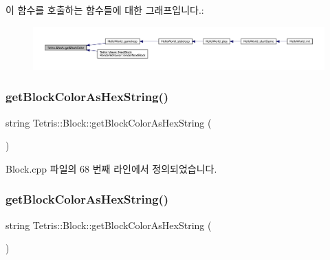 이 함수를 호출하는 함수들에 대한 그래프입니다.\+:
\nopagebreak
\begin{figure}[H]
\begin{center}
\leavevmode
\includegraphics[width=350pt]{class_tetris_1_1_block_ad61aea379870fbb3668d49e4c3c748ed_icgraph}
\end{center}
\end{figure}
\mbox{\label{class_tetris_1_1_block_a0adf3e3fbe9899115703913f18aaae6d}} 
\subsubsection{\texorpdfstring{get\+Block\+Color\+As\+Hex\+String()}{getBlockColorAsHexString()}\hspace{0.1cm}{\footnotesize\ttfamily [1/2]}}
{\footnotesize\ttfamily string Tetris\+::\+Block\+::get\+Block\+Color\+As\+Hex\+String (\begin{DoxyParamCaption}{ }\end{DoxyParamCaption})}



Block.\+cpp 파일의 68 번째 라인에서 정의되었습니다.

\mbox{\label{class_tetris_1_1_block_a0adf3e3fbe9899115703913f18aaae6d}} 
\subsubsection{\texorpdfstring{get\+Block\+Color\+As\+Hex\+String()}{getBlockColorAsHexString()}\hspace{0.1cm}{\footnotesize\ttfamily [2/2]}}
{\footnotesize\ttfamily string Tetris\+::\+Block\+::get\+Block\+Color\+As\+Hex\+String (\begin{DoxyParamCaption}{ }\end{DoxyParamCaption})\hspace{0.3cm}{\ttfamily [inline]}}

